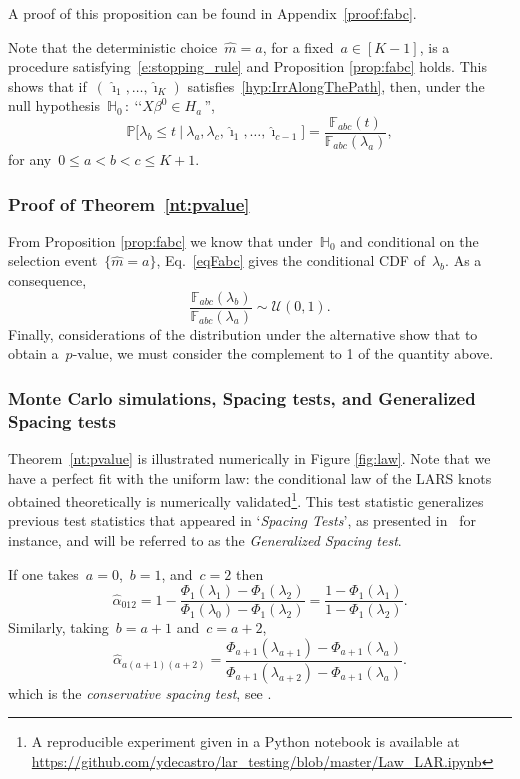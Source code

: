 \documentclass[final,numbib]{imaiai}%
\numberwithin{equation}{section}
\def\eq{\begin{equation}}
\def\qe{\end{equation}}
\def\bbF{\mathds{F}}
\def\bbP{\mathds{P}}
\renewcommand{\hat}{\widehat}
\newcommand{\<}{\langle}
\renewcommand{\>}{\rangle}
\newcommand{\1}{\mathds{1}}
\begin{document}
{\noindent
A proof of this proposition can be found in Appendix~\ref{proof:fabc}.

\begin{remark}
Note that the deterministic choice~$\hat m=a$, for a fixed~$a\in[K-1]$, is a procedure satisfying~{\eqref{e:stopping_rule}} and Proposition \ref{prop:fabc} holds.
This shows that if~$(\,\hat \imath_1,\ldots, \hat \imath_K)$ satisfies~\eqref{hyp:IrrAlongThePath}, then, under the null hypothesis~$\mathds H_0\,:\ \text{‘‘}X\beta^0\in H_{a}\,\text{''}$,
\eq
\label{e:fabc}
\bbP\big[\lambda_b\leq t\ |\ \lambda_a,\lambda_c, \hat \imath_{1}, \ldots,\hat \imath_{c-1}\big]=\frac{\bbF_{abc}(t)}{\bbF_{abc}(\lambda_a)},
\qe
for any~$0\leq a<b<c\leq K+1$.
\end{remark}

\subsubsection{Proof of Theorem~\ref{nt:pvalue}}
\label{proof:nt:pvalue}
From Proposition \ref{prop:fabc} we know that under~$\mathds H_0$ and conditional on the selection event~$\big\{\hat m=a\big\}$, Eq.~\eqref{eqFabc} gives the conditional CDF of~$\lambda_b$.
As a consequence, %
  \[
  \frac{
  \bbF_{abc}(\lambda_b)    }{    \bbF_{abc}(\lambda_a)  }  \sim  \mathcal  U(0,1).
  \]
  Finally, considerations of the distribution under the alternative  show that to obtain a~$p$-value, we must consider the complement to 1 of  the quantity above.

%

\subsubsection{Monte Carlo simulations, Spacing tests, and Generalized Spacing tests}
Theorem~\ref{nt:pvalue} is illustrated numerically in Figure \ref{fig:law}.
Note that we have a perfect fit with the uniform law: the conditional law of the LARS knots obtained theoretically is numerically validated\footnote{A reproducible experiment given in a Python notebook is available at \url{https://github.com/ydecastro/lar_testing/blob/master/Law_LAR.ipynb}}. This test statistic generalizes previous test statistics that appeared in `\textit{Spacing Tests}', as presented in~\cite[Chapter~5]{hastie2015statistical} for instance, and will be referred to as the {\it Generalized Spacing test}.

\begin{remark}
\label{rem:ST}
If one takes~$a=0$,~$b=1$, and~$c=2$ then
\[
\hat\alpha_{012}=1-\frac{\Phi_{1}(\lambda_1)-\Phi_{1}(\lambda_2)}{\Phi_{1}(\lambda_0)-\Phi_{1}(\lambda_2)}
=\frac{1-\Phi_{1}(\lambda_1)}{1-\Phi_{1}(\lambda_2)}.
\]
Similarly, taking~$b=a+1$ and~$c=a+2$,
\[
\hat\alpha_{a(a+1)(a+2)}
=\frac
{\Phi_{{a+1}}(\lambda_{a+1})-\Phi_{{a+1}}(\lambda_a)}
{\Phi_{{a+1}}(\lambda_{a+2})-\Phi_{{a+1}}(\lambda_a)}.
\]
which is the {\it conservative spacing test}, see \cite[Theorem~2]{taylor2014exact}.
\end{remark}

}
\end{document}
